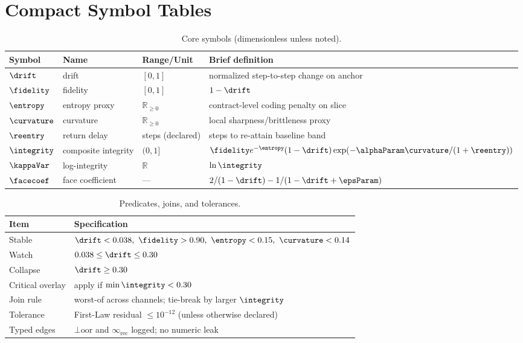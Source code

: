 \section{Compact Symbol Tables}
\label{apx:tables}
\begin{table}[h]
  \centering
  \caption{Core symbols (dimensionless unless noted).}
  \label{tab:notation-core}
  \footnotesize
  \begingroup\setlength{\tabcolsep}{6pt}
  \begin{tabularx}{\linewidth}{@{} l l l >{\raggedright\arraybackslash}X @{}}
    \toprule
    Symbol & Name & Range/Unit & Brief definition \\
    \midrule
    \(\drift\)     & drift & \([0,1]\) & normalized step-to-step change on anchor \\
    \(\fidelity\)  & fidelity & \([0,1]\) & \(1-\drift\) \\
    \(\entropy\)   & entropy proxy & \(\mathbb{R}_{\ge 0}\) & contract-level coding penalty on slice \\
    \(\curvature\) & curvature & \(\mathbb{R}_{\ge 0}\) & local sharpness/brittleness proxy \\
    \(\reentry\)   & return delay & steps (declared) & steps to re-attain baseline band \\
    \(\integrity\) & composite integrity & \((0,1]\) & \(\fidelity e^{-\entropy}(1-\drift)\exp(-\alphaParam\curvature/(1+\reentry))\) \\
    \(\kappaVar\)  & log-integrity & \(\mathbb{R}\) & \(\ln \integrity\) \\
    \(\facecoef\)  & face coefficient & — & \(2/(1-\drift)-1/(1-\drift+\epsParam)\) \\
    \bottomrule
  \end{tabularx}
  \endgroup
\end{table}

\begin{table}[h]
  \centering
  \caption{Predicates, joins, and tolerances.}
  \label{tab:notation-predicates}
  \footnotesize
  \begingroup\setlength{\tabcolsep}{6pt}
  \begin{tabularx}{\linewidth}{@{} l >{\raggedright\arraybackslash}X @{}}
    \toprule
    Item & Specification \\
    \midrule
    Stable & \(\drift<0.038,\ \fidelity>0.90,\ \entropy<0.15,\ \curvature<0.14\) \\
    Watch & \(0.038\le \drift \le 0.30\) \\
    Collapse & \(\drift\ge 0.30\) \\
    Critical overlay & apply if \(\min\integrity<0.30\) \\
    Join rule & worst-of across channels; tie-break by larger \(\integrity\) \\
    Tolerance & First-Law residual \(\le 10^{-12}\) (unless otherwise declared) \\
    Typed edges & \(\bot\!\mathrm{oor}\) and \(\infty_{\mathrm{rec}}\) logged; no numeric leak \\
    \bottomrule
  \end{tabularx}
  \endgroup
\end{table}

